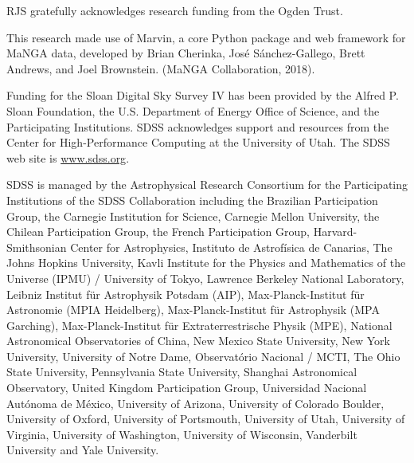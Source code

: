 \documentclass[useAMS,usenatbib]{mn2e}
\begin{document}
RJS gratefully acknowledges research funding from the Ogden Trust. 

This research made use of Marvin, a core Python package and web framework for MaNGA data, developed by Brian Cherinka, Jos\'e S\'anchez-Gallego, Brett Andrews, and Joel Brownstein. (MaNGA Collaboration, 2018).

Funding for the Sloan Digital Sky Survey IV has been provided by the Alfred P. Sloan Foundation, the U.S. Department of Energy Office of Science, and the Participating Institutions. SDSS acknowledges support and resources from the Center for High-Performance Computing at the University of Utah. The SDSS web site is \url{www.sdss.org}.

SDSS is managed by the Astrophysical Research Consortium for the Participating Institutions of the SDSS Collaboration including the Brazilian Participation Group, the Carnegie Institution for Science, Carnegie Mellon University, the Chilean Participation Group, the French Participation Group, Harvard-Smithsonian Center for Astrophysics, Instituto de Astrof\'isica de Canarias, The Johns Hopkins University, Kavli Institute for the Physics and Mathematics of the Universe (IPMU) / University of Tokyo, Lawrence Berkeley National Laboratory, Leibniz Institut für Astrophysik Potsdam (AIP), Max-Planck-Institut f\"ur Astronomie (MPIA Heidelberg), Max-Planck-Institut für Astrophysik (MPA Garching), Max-Planck-Institut f\"ur Extraterrestrische Physik (MPE), National Astronomical Observatories of China, New Mexico State University, New York University, University of Notre Dame, Observat\'orio Nacional / MCTI, The Ohio State University, Pennsylvania State University, Shanghai Astronomical Observatory, United Kingdom Participation Group, Universidad Nacional Aut\'onoma de M\'exico, University of Arizona, University of Colorado Boulder, University of Oxford, University of Portsmouth, University of Utah, University of Virginia, University of Washington, University of Wisconsin, Vanderbilt University and Yale University.



  
\end{document}
